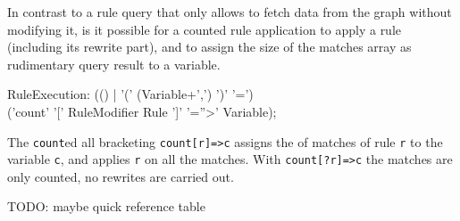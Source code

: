 In contrast to a rule query that only allows to fetch data from the graph without modifying it, is it possible for a counted rule application to apply a rule (including its rewrite part), and to assign the size of the matches array as rudimentary query result to a variable.

\begin{rail}
  RuleExecution: (() 
	| '(' (Variable+',') ')' '=') \\ ('count' '[' RuleModifier Rule ']' '=''>' Variable);
\end{rail}

The \texttt{count}ed all bracketing \texttt{count[r]=>c} assigns the  of matches of rule \texttt{r} to the variable \texttt{c}, and applies \texttt{r} on all the matches.
With \texttt{count[?r]=>c} the matches are only counted, no rewrites are carried out.

TODO: maybe quick reference table


